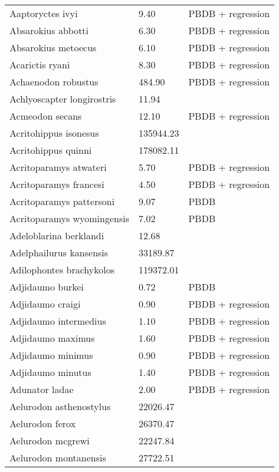 \documentclass{article}
\begin{document}
\begin{center}
\begin{longtable}{p{} p{} p{}}
    \hline \hline
    \endlastfoot
    Aaptoryctes ivyi & 9.40 & PBDB + regression \\ 
    Absarokius abbotti & 6.30 & PBDB + regression \\ 
    Absarokius metoecus & 6.10 & PBDB + regression \\ 
    Acarictis ryani & 8.30 & PBDB + regression \\ 
    Achaenodon robustus & 484.90 & PBDB + regression \\ 
    Achlyoscapter longirostris & 11.94 & \cite{Tomiya2013} \\ 
    Acmeodon secans & 12.10 & PBDB + regression \\ 
    Acritohippus isonesus & 135944.23 & \cite{Tomiya2013} \\ 
    Acritohippus quinni & 178082.11 & \cite{Tomiya2013} \\ 
    Acritoparamys atwateri & 5.70 & PBDB + regression \\ 
    Acritoparamys francesi & 4.50 & PBDB + regression \\ 
    Acritoparamys pattersoni & 9.07 & PBDB \\ 
    Acritoparamys wyomingensis & 7.02 & PBDB \\ 
    Adeloblarina berklandi & 12.68 & \cite{Tomiya2013} \\ 
    Adelphailurus kansensis & 33189.87 & \cite{Tomiya2013} \\ 
    Adilophontes brachykolos & 119372.01 & \cite{Tomiya2013} \\ 
    Adjidaumo burkei & 0.72 & PBDB \\ 
    Adjidaumo craigi & 0.90 & PBDB + regression \\ 
    Adjidaumo intermedius & 1.10 & PBDB + regression \\ 
    Adjidaumo maximus & 1.60 & PBDB + regression \\ 
    Adjidaumo minimus & 0.90 & PBDB + regression \\ 
    Adjidaumo minutus & 1.40 & PBDB + regression \\ 
    Adunator ladae & 2.00 & PBDB + regression \\ 
    Aelurodon asthenostylus & 22026.47 & \cite{Tomiya2013} \\ 
    Aelurodon ferox & 26370.47 & \cite{Tomiya2013} \\ 
    Aelurodon mcgrewi & 22247.84 & \cite{Tomiya2013} \\ 
    Aelurodon montanensis & 27722.51 & \cite{Tomiya2013} \\ 

\end{longtable}
\end{center}
\end{document}
